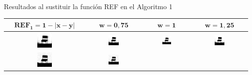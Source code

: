 \documentclass{beamer}
\theoremstyle{plain} %
\theoremstyle{definition}
\newcommand{\abs}[1]{\left\vert#1\right\vert}
\newcommand{\bb}{\bfseries}
\begin{document}
\begin{frame}{Resultados al sustituir la función REF en el Algoritmo 1}
  \begin{table}
  \centering
  \begin{tabular}{c||c|c|c} 
  $\mathbf{REF_1=1-\abs{x-y}}$ & $\mathbf{w=0,75}$ &\bb $\mathbf{w=1}$ &\bb $\mathbf{w=1,25}$\\\hline\hline
  \includegraphics[width=0.2\textwidth]{img/res/e1a/alg1tipo1-chairga.jpg} &
  \includegraphics[width=0.2\textwidth]{img/res/e1a/alg1tipo6-chairga.jpg} &
  \includegraphics[width=0.2\textwidth]{img/res/e1a/alg1tipo6d0.75-chairga.jpg} &
  \includegraphics[width=0.2\textwidth]{img/res/e1a/alg1tipo6d1.25-chairga.jpg} \\
  \includegraphics[width=0.2\textwidth]{img/res/e1a/alg1tipo1-chairsp005.jpg} &
  \includegraphics[width=0.2\textwidth]{img/res/e1a/alg1tipo6-chairsp005.jpg} &

\end{tabular}
\end{table}
\end{frame}
\end{document}
